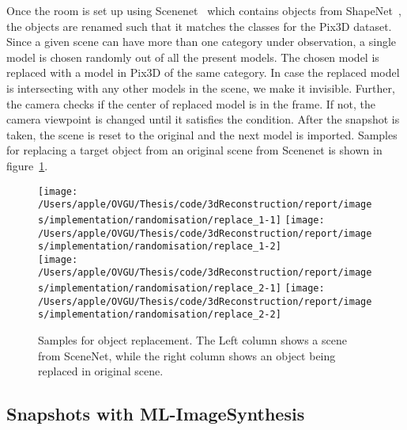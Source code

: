 Once the room is set up using Scenenet~\cite{McCormac:etal:ICCV2017} which contains objects from ShapeNet~\cite{chang2015shapenet}, the objects are renamed such that it matches the classes for the Pix3D dataset.
Since a given scene can have more than one category under observation, a single model is chosen randomly out of all the present models.
The chosen model is replaced with a model in Pix3D of the same category.
In case the replaced model is intersecting with any other models in the scene, we make it invisible.
Further, the camera checks if the center of replaced model is in the frame.
If not, the camera viewpoint is changed until it satisfies the condition.
After the snapshot is taken, the scene is reset to the original and the next model is imported.
Samples for replacing a target object from an original scene from Scenenet is shown in figure~\ref{fig:replace model}.

\begin{figure}
    \centering
        \texttt{[image: /Users/apple/OVGU/Thesis/code/3dReconstruction/report/images/implementation/randomisation/replace\_1-1]}
        \texttt{[image: /Users/apple/OVGU/Thesis/code/3dReconstruction/report/images/implementation/randomisation/replace\_1-2]} \\
        \vspace{0.1cm}
        \texttt{[image: /Users/apple/OVGU/Thesis/code/3dReconstruction/report/images/implementation/randomisation/replace\_2-1]}
        \texttt{[image: /Users/apple/OVGU/Thesis/code/3dReconstruction/report/images/implementation/randomisation/replace\_2-2]}\\
    \caption{Samples for object replacement. The Left column shows a scene from SceneNet, while the right column shows an object being replaced in original scene.}
    \label{fig:replace model}
\end{figure}

\subsection{Snapshots with ML-ImageSynthesis}\label{subsec:snapshots-with-ml-imagesynthesis}


